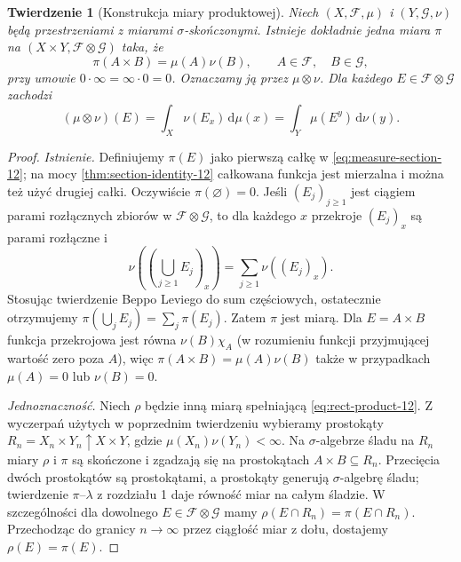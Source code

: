 \documentclass[11pt,a4paper,oneside]{book}
\numberwithin{equation}{chapter}
\theoremstyle{plain}
\newtheorem{twierdzenie}{Twierdzenie}[chapter]
\theoremstyle{definition}
\theoremstyle{remark}
\begin{document}
\begin{twierdzenie}[Konstrukcja miary produktowej]
\label{thm:product-measure-12}
Niech $(X,\mathcal F,\mu)$ i $(Y,\mathcal G,\nu)$
będą przestrzeniami z miarami $\sigma$-skończonymi.
Istnieje dokładnie jedna miara $\pi$ na
$(X\times Y,\mathcal F\otimes\mathcal G)$ taka, że
\begin{equation}\label{eq:rect-product-12}
\pi(A\times B)=\mu(A)\nu(B),
\qquad A\in\mathcal F,\quad B\in\mathcal G,
\end{equation}
przy umowie $0\cdot\infty=\infty\cdot0=0$.
Oznaczamy ją przez $\mu\otimes\nu$.
Dla każdego $E\in\mathcal F\otimes\mathcal G$ zachodzi
\begin{equation}\label{eq:measure-section-12}
(\mu\otimes\nu)(E)=
\int_X\nu(E_x)\,\mathrm d\mu(x)
=\int_Y\mu(E^y)\,\mathrm d\nu(y).
\end{equation}
\end{twierdzenie}
\begin{proof}
\emph{Istnienie.}
Definiujemy $\pi(E)$ jako pierwszą całkę
w \eqref{eq:measure-section-12}; na mocy
\ref{thm:section-identity-12} całkowana funkcja jest
mierzalna i można też użyć drugiej całki.
Oczywiście $\pi(\varnothing)=0$.
Jeśli $(E_j)_{j\ge1}$ jest ciągiem parami
rozłącznych zbiorów w $\mathcal F\otimes\mathcal G$,
to dla każdego $x$ przekroje $(E_j)_x$ są parami
rozłączne i
\[
\nu\left(\left(\bigcup_{j\ge1}E_j\right)_x\right)
=\sum_{j\ge1}\nu((E_j)_x).
\]
Stosując twierdzenie Beppo Leviego do sum częściowych,
ostatecznie otrzymujemy
$\pi(\bigcup_jE_j)=\sum_j\pi(E_j)$.
Zatem $\pi$ jest miarą.
Dla $E=A\times B$ funkcja przekrojowa jest równa
$\nu(B)\chi_A$ (w rozumieniu funkcji przyjmującej
wartość zero poza $A$), więc
$\pi(A\times B)=\mu(A)\nu(B)$ także w przypadkach
$\mu(A)=0$ lub $\nu(B)=0$.

\emph{Jednoznaczność.}
Niech $\rho$ będzie inną miarą spełniającą
\eqref{eq:rect-product-12}. Z wyczerpań użytych
w poprzednim twierdzeniu wybieramy prostokąty
$R_n=X_n\times Y_n\uparrow X\times Y$, gdzie
$\mu(X_n)\nu(Y_n)<\infty$.
Na $\sigma$-algebrze śladu na $R_n$ miary
$\rho$ i $\pi$ są skończone i zgadzają się na
prostokątach $A\times B\subseteq R_n$.
Przecięcia dwóch prostokątów są prostokątami,
a prostokąty generują $\sigma$-algebrę śladu;
twierdzenie $\pi$--$\lambda$ z rozdziału 1 daje
równość miar na całym śladzie.
W szczególności dla dowolnego
$E\in\mathcal F\otimes\mathcal G$ mamy
$\rho(E\cap R_n)=\pi(E\cap R_n)$.
Przechodząc do granicy $n\to\infty$ przez
ciągłość miar z dołu, dostajemy $\rho(E)=\pi(E)$.
\end{proof}
\end{document}
